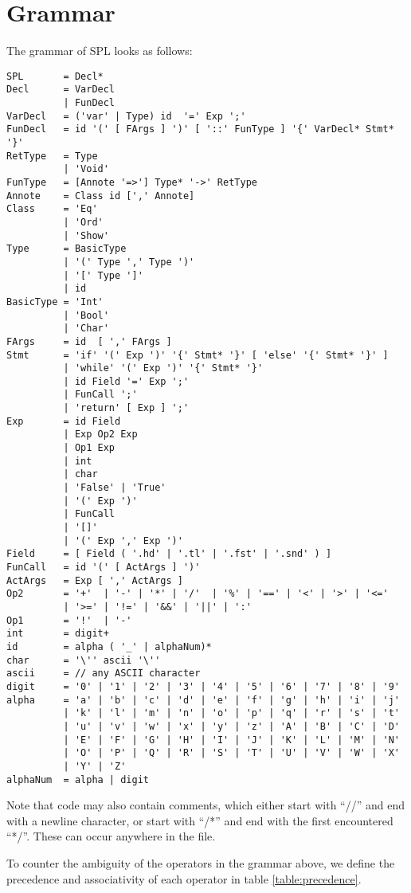\chapter{Grammar}\label{appendix:grammar}
The grammar of SPL looks as follows:

\begin{lstlisting}
SPL       = Decl*
Decl      = VarDecl
          | FunDecl
VarDecl   = ('var' | Type) id  '=' Exp ';'
FunDecl   = id '(' [ FArgs ] ')' [ '::' FunType ] '{' VarDecl* Stmt* '}'
RetType   = Type
          | 'Void'
FunType   = [Annote '=>'] Type* '->' RetType
Annote    = Class id [',' Annote]
Class     = 'Eq'
          | 'Ord'
          | 'Show'
Type      = BasicType
          | '(' Type ',' Type ')'
          | '[' Type ']'
          | id
BasicType = 'Int'
          | 'Bool'
          | 'Char'
FArgs     = id  [ ',' FArgs ]
Stmt      = 'if' '(' Exp ')' '{' Stmt* '}' [ 'else' '{' Stmt* '}' ]
          | 'while' '(' Exp ')' '{' Stmt* '}'
          | id Field '=' Exp ';'
          | FunCall ';'
          | 'return' [ Exp ] ';'
Exp       = id Field
          | Exp Op2 Exp
          | Op1 Exp
          | int
          | char
          | 'False' | 'True'
          | '(' Exp ')'
          | FunCall
          | '[]'
          | '(' Exp ',' Exp ')'
Field     = [ Field ( '.hd' | '.tl' | '.fst' | '.snd' ) ]
FunCall   = id '(' [ ActArgs ] ')'
ActArgs   = Exp [ ',' ActArgs ]
Op2       = '+'  | '-' | '*' | '/'  | '%' | '==' | '<' | '>' | '<='
          | '>=' | '!=' | '&&' | '||' | ':'
Op1       = '!'  | '-'
int       = digit+
id        = alpha ( '_' | alphaNum)*
char      = '\'' ascii '\''
ascii     = // any ASCII character
digit     = '0' | '1' | '2' | '3' | '4' | '5' | '6' | '7' | '8' | '9'
alpha     = 'a' | 'b' | 'c' | 'd' | 'e' | 'f' | 'g' | 'h' | 'i' | 'j'
          | 'k' | 'l' | 'm' | 'n' | 'o' | 'p' | 'q' | 'r' | 's' | 't'
          | 'u' | 'v' | 'w' | 'x' | 'y' | 'z' | 'A' | 'B' | 'C' | 'D'
          | 'E' | 'F' | 'G' | 'H' | 'I' | 'J' | 'K' | 'L' | 'M' | 'N'
          | 'O' | 'P' | 'Q' | 'R' | 'S' | 'T' | 'U' | 'V' | 'W' | 'X'
          | 'Y' | 'Z'
alphaNum  = alpha | digit
\end{lstlisting}

Note that code may also contain comments, which either start with ``//'' and end with a newline character, or start with ``/*'' and end with the first encountered ``*/''. These can occur anywhere in the file.

To counter the ambiguity of the operators in the grammar above, we define the precedence and associativity of each operator in table \ref{table:precedence}.

